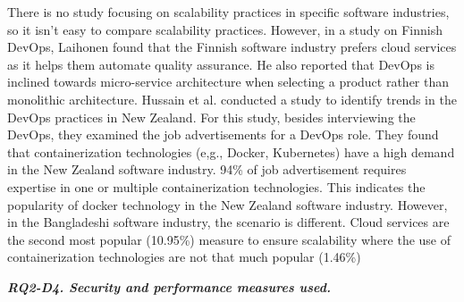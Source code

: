 There is no study focusing on scalability practices in specific software industries, so it isn't easy to compare scalability practices. However, in a study on Finnish DevOps, Laihonen\citep{Laihonen2018} found that the Finnish software industry prefers cloud services as it helps them automate quality assurance. He also reported that DevOps is inclined towards micro-service architecture when selecting a product rather than monolithic architecture. Hussain et al.\citep{Hussain2017} conducted a study to identify trends in the DevOps practices in New Zealand. For this study, besides interviewing the DevOps, they examined the job advertisements for a DevOps role. They found that containerization technologies (e,g., Docker, Kubernetes) have a high demand in the New Zealand software industry. 94\% of job advertisement requires expertise in one or multiple containerization technologies. This indicates the popularity of docker technology in the New Zealand software industry. However, in the Bangladeshi software industry, the scenario is different. Cloud services are the second most popular (10.95\%) measure to ensure scalability where the use of containerization technologies are not that much popular (1.46\%)

\begin{tcolorbox}[flushleft upper,boxrule=1pt,arc=0pt,left=0pt,right=0pt,top=0pt,bottom=0pt,colback=white,after=\ignorespacesafterend\par\noindent]
\nd\it{\bf{RQ2-D4. Security and performance measures used.}} 
\end{tcolorbox}